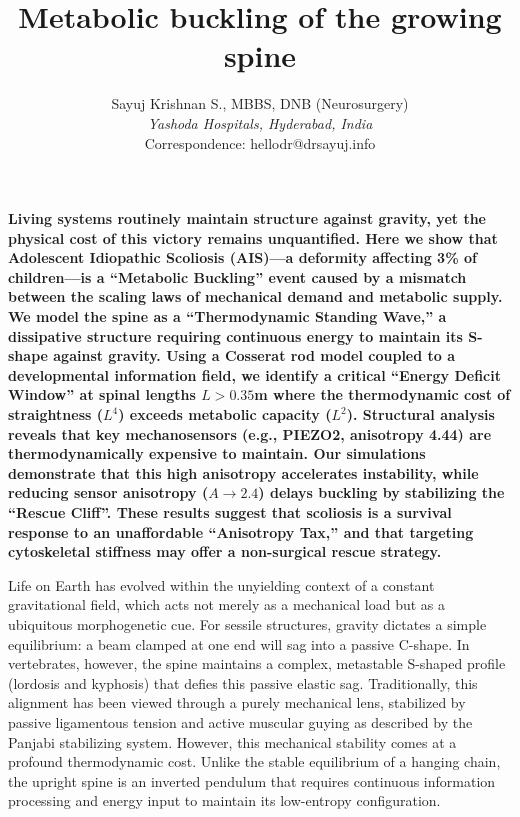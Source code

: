 \documentclass[11pt]{article}
\title{Metabolic buckling of the growing spine}
\author{Sayuj Krishnan S., MBBS, DNB (Neurosurgery) \\
\textit{Yashoda Hospitals, Hyderabad, India} \\
Correspondence: hellodr@drsayuj.info}
\date{}
\begin{document}
\maketitle

\textbf{Living systems routinely maintain structure against gravity, yet the physical cost of this victory remains unquantified. Here we show that Adolescent Idiopathic Scoliosis (AIS)—a deformity affecting 3\% of children—is a ``Metabolic Buckling'' event caused by a mismatch between the scaling laws of mechanical demand and metabolic supply. We model the spine as a ``Thermodynamic Standing Wave,'' a dissipative structure requiring continuous energy to maintain its S-shape against gravity. Using a Cosserat rod model coupled to a developmental information field, we identify a critical ``Energy Deficit Window'' at spinal lengths $L > 0.35$m where the thermodynamic cost of straightness ($L^4$) exceeds metabolic capacity ($L^2$). Structural analysis reveals that key mechanosensors (e.g., PIEZO2, anisotropy 4.44) are thermodynamically expensive to maintain. Our simulations demonstrate that this high anisotropy accelerates instability, while reducing sensor anisotropy ($A \to 2.4$) delays buckling by stabilizing the ``Rescue Cliff''. These results suggest that scoliosis is a survival response to an unaffordable ``Anisotropy Tax,'' and that targeting cytoskeletal stiffness may offer a non-surgical rescue strategy.}

\vspace{1em}

Life on Earth has evolved within the unyielding context of a constant gravitational field, which acts not merely as a mechanical load but as a ubiquitous morphogenetic cue\cite{thompson1917growth, ingber2008tensegrity}. For sessile structures, gravity dictates a simple equilibrium: a beam clamped at one end will sag into a passive C-shape. In vertebrates, however, the spine maintains a complex, metastable S-shaped profile (lordosis and kyphosis) that defies this passive elastic sag\cite{latimer2005upright}. Traditionally, this alignment has been viewed through a purely mechanical lens, stabilized by passive ligamentous tension and active muscular guying as described by the Panjabi stabilizing system\cite{panjabi1992stabilizing}. However, this mechanical stability comes at a profound thermodynamic cost. Unlike the stable equilibrium of a hanging chain, the upright spine is an inverted pendulum that requires continuous information processing and energy input to maintain its low-entropy configuration\cite{kuo2005optimal, schneider1994life}.
\end{document}
